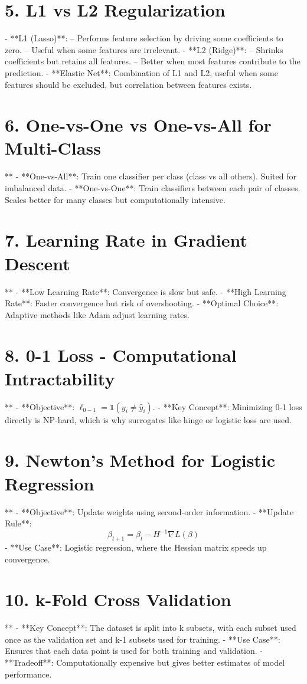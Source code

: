 \documentclass[10pt]{article}
\begin{document}
\begin{multicols}{2}
\section*{5. L1 vs L2 Regularization}
- **L1 (Lasso)**:
-- Performs feature selection by driving some coefficients to zero.
-- Useful when some features are irrelevant.
- **L2 (Ridge)**:
-- Shrinks coefficients but retains all features.
-- Better when most features contribute to the prediction.
- **Elastic Net**: Combination of L1 and L2, useful when some features should be excluded, but correlation between features exists.

\section*{6. One-vs-One vs One-vs-All for Multi-Class}**
- **One-vs-All**: Train one classifier per class (class vs all others). Suited for imbalanced data.
- **One-vs-One**: Train classifiers between each pair of classes. Scales better for many classes but computationally intensive.

\section*{7. Learning Rate in Gradient Descent}**
- **Low Learning Rate**: Convergence is slow but safe.
- **High Learning Rate**: Faster convergence but risk of overshooting.
- **Optimal Choice**: Adaptive methods like Adam adjust learning rates.

\section*{8. 0-1 Loss - Computational Intractability}**
- **Objective**: $\ell_{0-1} = \mathbb{1}(y_i \neq \hat{y}_i)$.
- **Key Concept**: Minimizing 0-1 loss directly is NP-hard, which is why surrogates like hinge or logistic loss are used.

\section*{9. Newton's Method for Logistic Regression}**
- **Objective**: Update weights using second-order information.
- **Update Rule**: 
  \[
  \beta_{t+1} = \beta_t - H^{-1} \nabla L(\beta)
  \]
- **Use Case**: Logistic regression, where the Hessian matrix speeds up convergence.

\section*{10. k-Fold Cross Validation}**
- **Key Concept**: The dataset is split into k subsets, with each subset used once as the validation set and k-1 subsets used for training.
- **Use Case**: Ensures that each data point is used for both training and validation.
- **Tradeoff**: Computationally expensive but gives better estimates of model performance.


\end{multicols}
\end{document}
